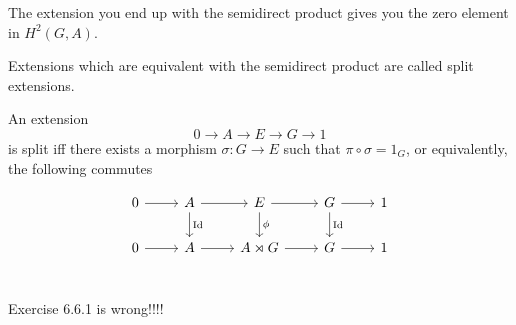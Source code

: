 \begin{remark}
    The extension you end up with the semidirect product gives you the zero element in $H^2(G,A)$.
\end{remark}
\begin{remark}
    Extensions which are equivalent with the semidirect product are called split extensions.
\end{remark}
\begin{definition}
    An extension  
    \[
    0 \to  A \to  E \to G \to  1
    \] 
    is split iff there exists a morphism $\sigma: G \to  E$ such that $\pi  \circ  \sigma = 1_G$,
    or equivalently, the following commutes

    \[
        \begin{tikzcd}
            0 \arrow[r, ""] 
            & A \arrow[r, ""] \arrow[d, "\operatorname{Id}"]
            & E \arrow[r, ""]  \arrow[d, "\phi"]
            & G \arrow[r, ""] \arrow[d, "\operatorname{Id}"] 
            & 1 \\
            0 \arrow[r, ""] 
            & A \arrow[r, ""]
            & A \rtimes G \arrow[r, ""]
            & G \arrow[r, ""] 
            & 1 \\
        \end{tikzcd}
    \]
\end{definition}

\begin{remark}
    Exercise 6.6.1 is wrong!!!!
\end{remark}
